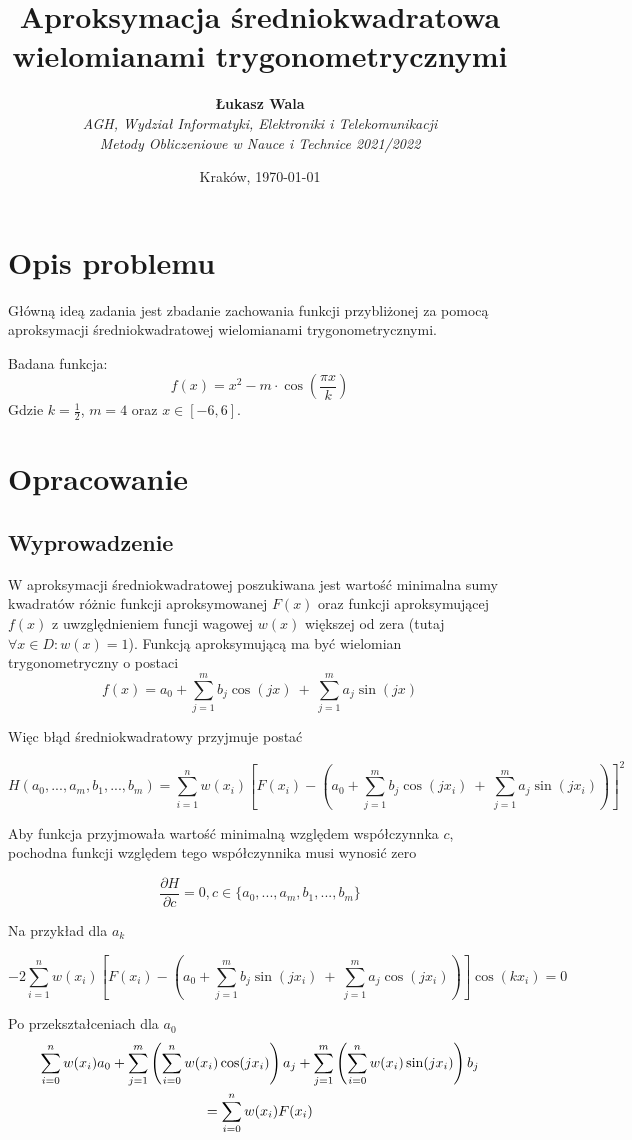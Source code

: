 \documentclass{article}
\title{Aproksymacja średniokwadratowa wielomianami trygonometrycznymi}
\author{\textbf{Łukasz Wala}\\
    \textit{AGH, Wydział Informatyki, Elektroniki i Telekomunikacji} \\
    \textit{Metody Obliczeniowe w Nauce i Technice 2021/2022}}
\date{Kraków, \today}
\begin{document}
\maketitle

\section{Opis problemu}
Główną ideą zadania jest zbadanie zachowania funkcji przybliżonej za pomocą aproksymacji
średniokwadratowej wielomianami trygonometrycznymi.

Badana funkcja:
\[f(x)=x^2-m\cdot\cos\left(\frac{\pi x}{k}\right)\]
Gdzie $k=\frac{1}{2}$, $m=4$ oraz $x\in [-6,6]$.

\section{Opracowanie}
\subsection{Wyprowadzenie}
W aproksymacji średniokwadratowej poszukiwana jest wartość minimalna sumy kwadratów różnic funkcji aproksymowanej $F(x)$
oraz funkcji aproksymującej $f(x)$ z uwzględnieniem funcji wagowej $w(x)$ większej od zera (tutaj $\forall x \in D
:w(x) = 1$). Funkcją aproksymującą ma być wielomian trygonometryczny o postaci
$$\displaystyle f(x) = a_0 + \sum_{j=1}^mb_j\cos(jx)\:+\:\sum_{j=1}^m a_j\sin(jx)$$

Więc błąd średniokwadratowy przyjmuje postać

$$\displaystyle H(a_0, ..., a_m, b_1, ..., b_m)=\sum_{i=1}^nw(x_i)\left[F(x_i)-(a_0 + \sum_{j=1}^mb_j\cos(jx_i)\:+\:\sum_{j=1}^m a_j\sin(jx_i))\right]^2$$

Aby funkcja przyjmowała wartość minimalną względem współczynnka $c$, pochodna funkcji względem tego współczynnika musi
wynosić zero

$$\frac{\partial H}{\partial c}=0, c \in \{a_0, ..., a_m, b_1, ..., b_m\}$$

Na przykład dla $a_k$

$$\displaystyle -2\sum_{i=1}^nw(x_i)\left[F(x_i)-(a_0 + \sum_{j=1}^mb_j\sin(jx_i)\:+\:\sum_{j=1}^m a_j\cos(jx_i))\right]\cos(kx_i) = 0$$

Po przekształceniach dla $a_0$
\begin{multline*}
    $$\displaystyle \sum_{i=0}^nw(x_i)a_0+\sum_{j=1}^m\left(\sum_{i=0}^nw(x_i)\cos(jx_i)\right)a_j+
    \sum_{j=1}^m\left(\sum_{i=0}^nw(x_i)\sin(jx_i)\right)b_j \\=\sum_{i=0}^nw(x_i)F(x_i)$$
\end{multline*}
\end{document}
